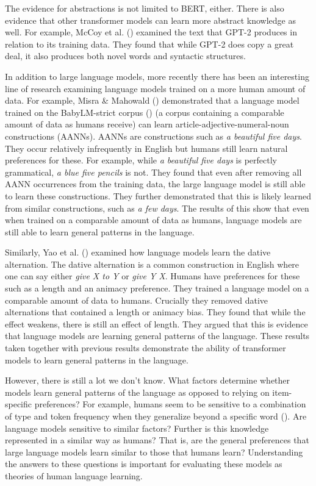 \documentclass[
  12pt,
  letterpaper,
]{scrreprt}
\begin{document}
The evidence for abstractions is not limited to BERT, either. There is
also evidence that other transformer models can learn more abstract
knowledge as well. For example, McCoy et al.
() examined the text that
GPT-2 produces in relation to its training data. They found that while
GPT-2 does copy a great deal, it also produces both novel words and
syntactic structures.

In addition to large language models, more recently there has been an
interesting line of research examining language models trained on a more
human amount of data. For example, Misra \& Mahowald
() demonstrated that a
language model trained on the BabyLM-strict corpus
() (a corpus containing a comparable amount of data as humans
receive) can learn article-adjective-numeral-noun constructions (AANNs).
AANNs are constructions such as \emph{a beautiful five days}. They occur
relatively infrequently in English but humans still learn natural
preferences for these. For example, while \emph{a beautiful five days}
is perfectly grammatical, \emph{a blue five pencils} is not. They found
that even after removing all AANN occurrences from the training data,
the large language model is still able to learn these constructions.
They further demonstrated that this is likely learned from similar
constructions, such as \emph{a few days}. The results of this show that
even when trained on a comparable amount of data as humans, language
models are still able to learn general patterns in the language.

Similarly, Yao et al. ()
examined how language models learn the dative alternation. The dative
alternation is a common construction in English where one can say either
\emph{give X to Y} or \emph{give Y X}. Humans have preferences for these
such as a length and an animacy preference. They trained a language
model on a comparable amount of data to humans. Crucially they removed
dative alternations that contained a length or animacy bias. They found
that while the effect weakens, there is still an effect of length. They
argued that this is evidence that language models are learning general
patterns of the language. These results taken together with previous
results demonstrate the ability of transformer models to learn general
patterns in the language.

However, there is still a lot we don't know. What factors determine
whether models learn general patterns of the language as opposed to
relying on item-specific preferences? For example, humans seem to be
sensitive to a combination of type and token frequency when they
generalize beyond a specific word
().
Are language models sensitive to similar factors? Further is this
knowledge represented in a similar way as humans? That is, are the
general preferences that large language models learn similar to those
that humans learn? Understanding the answers to these questions is
important for evaluating these models as theories of human language
learning.
\end{document}
